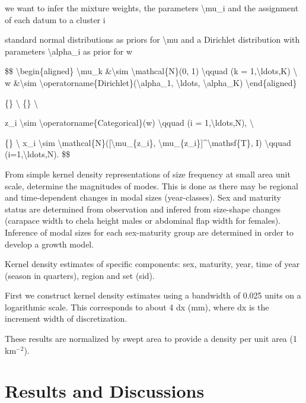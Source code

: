 \documentclass[12pt,letterpaper,]{paper}
\begin{document}
we want to infer the mixture weights, the parameters
\textbackslash mu\_i and the assignment of each datum to a cluster i

standard normal distributions as priors for \textbackslash mu and a
Dirichlet distribution with parameters \textbackslash alpha\_i as prior
for w

\$\$ \textbackslash begin\{aligned\} \textbackslash mu\_k
\&\textbackslash sim \textbackslash mathcal\{N\}(0, 1)
\textbackslash qquad (k = 1,\textbackslash ldots,K) \textbackslash{} w
\&\textbackslash sim
\textbackslash operatorname\{Dirichlet\}(\textbackslash alpha\_1,
\textbackslash ldots, \textbackslash alpha\_K)
\textbackslash end\{aligned\}

\{\} \textbackslash{} \{\} \textbackslash{}

z\_i \textbackslash sim \textbackslash operatorname\{Categorical\}(w)
\textbackslash qquad (i = 1,\textbackslash ldots,N), \textbackslash{}

\{\} \textbackslash{} x\_i \textbackslash sim
\textbackslash mathcal\{N\}({[}\textbackslash mu\_\{z\_i\},
\textbackslash mu\_\{z\_i\}{]}\^{}\textbackslash mathsf\{T\}, I)
\textbackslash qquad (i=1,\textbackslash ldots,N). \$\$

From simple kernel density representations of size frequency at small
area unit scale, determine the magnitudes of modes. This is done as
there may be regional and time-dependent changes in modal sizes
(year-classes). Sex and maturity status are determined from observation
and infered from size-shape changes (carapace width to chela height
males or abdominal flap width for females). Inference of modal sizes for
each sex-maturity group are determined in order to develop a growth
model.

Kernel density estimates of specific components: sex, maturity, year,
time of year (season in quarters), region and set (sid).

First we construct kernel density estimates using a bandwidth of 0.025
units on a logarithmic scale. This corresponds to about 4 dx (mm), where
dx is the increment width of discretization.

These results are normalized by swept area to provide a density per unit
area (1 km\(^{-2}\)).

\section{Results and Discussions}\label{results-and-discussions}
\end{document}
